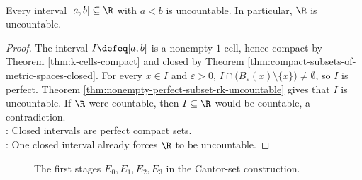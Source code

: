 \begin{corollary} \label{cor:closed-intervals-and-reals-uncountable} \\
Every interval $[a,b]\subseteq\R$ with $a<b$ is uncountable. In particular, $\R$ is uncountable.
\begin{proof}
The interval $I\defeq[a,b]$ is a nonempty $1$-cell, hence compact by Theorem \ref{thm:k-cells-compact} and closed by Theorem \ref{thm:compact-subsets-of-metric-spaces-closed}. For every $x\in I$ and $\varepsilon>0$, $I\cap \bigl(B_{\varepsilon}(x)\setminus\{x\}\bigr)\neq\emptyset$, so $I$ is perfect. Theorem \ref{thm:nonempty-perfect-subset-rk-uncountable} gives that $I$ is uncountable. If $\R$ were countable, then $I\subseteq\R$ would be countable, a contradiction.\\
: Closed intervals are perfect compact sets.\\
: One closed interval already forces $\R$ to be uncountable.
\end{proof}
\end{corollary}

\begin{figure}[H]
  \centering
  
  \caption{The first stages $E_0,E_1,E_2,E_3$ in the Cantor-set construction.}
  \label{fig:cantor-set-first-stages}
\end{figure}

